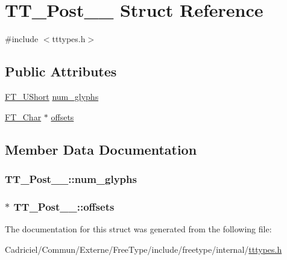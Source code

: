 \hypertarget{struct_t_t___post__25__}{\section{T\-T\-\_\-\-Post\-\_\-\_\- Struct Reference}
\label{struct_t_t___post__25__}
}


{\ttfamily \#include $<$tttypes.\-h$>$}

\subsection*{Public Attributes}
\begin{DoxyCompactItemize}
\item 
\hyperlink{fttypes_8h_a937f6c17cf5ffd09086d8610c37b9f58}{F\-T\-\_\-\-U\-Short} \hyperlink{struct_t_t___post__25___aae397ce6206c910ecc13f8b46bace595}{num\-\_\-glyphs}
\item 
\hyperlink{fttypes_8h_a0f851552b050883885f0a0855771f39d}{F\-T\-\_\-\-Char} $\ast$ \hyperlink{struct_t_t___post__25___a499ec966b258c8454e9ea8f9455028b6}{offsets}
\end{DoxyCompactItemize}


\subsection{Member Data Documentation}
\hypertarget{struct_t_t___post__25___aae397ce6206c910ecc13f8b46bace595}{
\subsubsection[{num\-\_\-glyphs}]{ T\-T\-\_\-\-Post\-\_\-\_\-\-::num\-\_\-glyphs}}\label{struct_t_t___post__25___aae397ce6206c910ecc13f8b46bace595}
\hypertarget{struct_t_t___post__25___a499ec966b258c8454e9ea8f9455028b6}{
\subsubsection[{offsets}]{$\ast$ T\-T\-\_\-\-Post\-\_\-\_\-\-::offsets}}\label{struct_t_t___post__25___a499ec966b258c8454e9ea8f9455028b6}


The documentation for this struct was generated from the following file\-:\begin{DoxyCompactItemize}
\item 
Cadriciel/\-Commun/\-Externe/\-Free\-Type/include/freetype/internal/\hyperlink{tttypes_8h}{tttypes.\-h}\end{DoxyCompactItemize}
